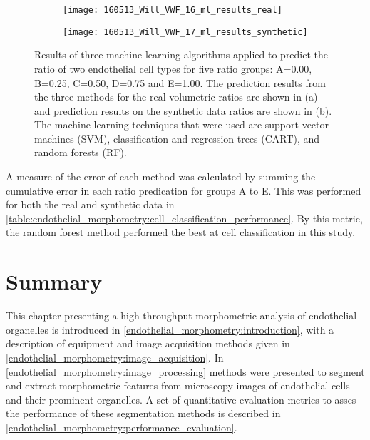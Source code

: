 \begin{figure}[htbp!]
	\centering
	\begin{subfigure}[b]{\linewidth}
		\centering
		\texttt{[image: 160513\_Will\_VWF\_16\_ml\_results\_real]}
		\caption{}
		\label{figure:endothelial_morphometry:cell_classification_performance:real}
		\vspace{1ex}
	\end{subfigure}
	\begin{subfigure}[b]{\linewidth}
		\centering
		\texttt{[image: 160513\_Will\_VWF\_17\_ml\_results\_synthetic]}
		\caption{}
		\label{figure:endothelial_morphometry:cell_classification_performance:synthetic}
		\vspace{1ex}
	\end{subfigure}
\caption[Machine learning results in cell classification study]{Results of three machine learning algorithms applied to predict the ratio of two endothelial cell types for five ratio groups: A=0.00, B=0.25, C=0.50, D=0.75 and E=1.00. The prediction results from the three methods for the real volumetric ratios are shown in (a) and prediction results on the synthetic data ratios are shown in (b). The machine learning techniques that were used are support vector machines (SVM), classification and regression trees (CART), and random forests (RF).}
\label{figure:endothelial_morphometry:cell_classification_performance}
\end{figure}

A measure of the error of each method was calculated by summing the cumulative error in each ratio predication for groups A to E. This was performed for both the real and synthetic data in \autoref{table:endothelial_morphometry:cell_classification_performance}. By this metric, the random forest method performed the best at cell classification in this study.

\section{Summary}
\label{endothelial_morphometry:summary}
This chapter presenting a high-throughput morphometric analysis of endothelial organelles is introduced in \autoref{endothelial_morphometry:introduction}, with a description of equipment and image acquisition methods given in \autoref{endothelial_morphometry:image_acquisition}. In \autoref{endothelial_morphometry:image_processing} methods were presented to segment and extract morphometric features from microscopy images of endothelial cells and their prominent organelles. A set of quantitative evaluation metrics to asses the performance of these segmentation methods is described in \autoref{endothelial_morphometry:performance_evaluation}.

